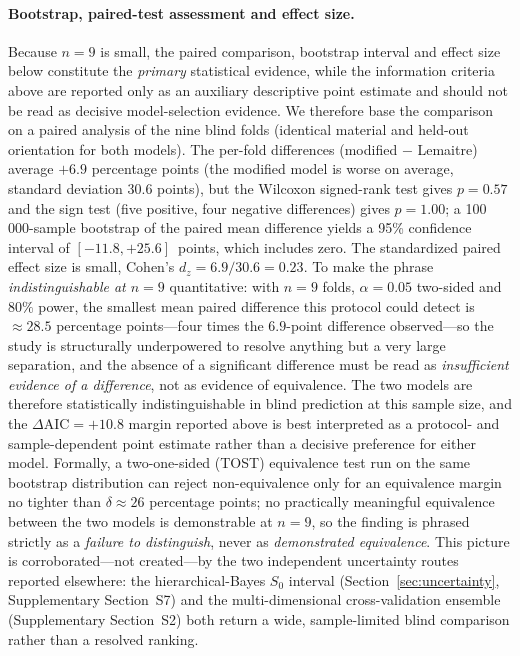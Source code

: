 \documentclass[12pt,a4paper,twocolumn]{article}
\begin{document}
\paragraph{Bootstrap, paired-test assessment and effect size.} Because $n = 9$ is small, the paired comparison, bootstrap interval and effect size below constitute the \emph{primary} statistical evidence, while the information criteria above are reported only as an auxiliary descriptive point estimate and should not be read as decisive model-selection evidence. We therefore base the comparison on a paired analysis of the nine blind folds (identical material and held-out orientation for both models). The per-fold differences (modified $-$ Lemaitre) average $+6.9$ percentage points (the modified model is worse on average, standard deviation $30.6$ points), but the Wilcoxon signed-rank test gives $p = 0.57$ and the sign test (five positive, four negative differences) gives $p = 1.00$; a 100\,000-sample bootstrap of the paired mean difference yields a 95\% confidence interval of $[-11.8, +25.6]$~points, which includes zero. The standardized paired effect size is small, Cohen's $d_z = 6.9/30.6 = 0.23$. To make the phrase \emph{indistinguishable at $n=9$} quantitative: with $n=9$ folds, $\alpha=0.05$ two-sided and $80\%$ power, the smallest mean paired difference this protocol could detect is $\approx 28.5$ percentage points---four times the $6.9$-point difference observed---so the study is structurally underpowered to resolve anything but a very large separation, and the absence of a significant difference must be read as \emph{insufficient evidence of a difference}, not as evidence of equivalence. The two models are therefore statistically indistinguishable in blind prediction at this sample size, and the $\Delta\mathrm{AIC} = +10.8$ margin reported above is best interpreted as a protocol- and sample-dependent point estimate rather than a decisive preference for either model. Formally, a two-one-sided (TOST) equivalence test run on the same bootstrap distribution can reject non-equivalence only for an equivalence margin no tighter than $\delta \approx 26$ percentage points; no practically meaningful equivalence between the two models is demonstrable at $n=9$, so the finding is phrased strictly as a \emph{failure to distinguish}, never as \emph{demonstrated equivalence}. This picture is corroborated---not created---by the two independent uncertainty routes reported elsewhere: the hierarchical-Bayes $S_0$ interval (Section~\ref{sec:uncertainty}, Supplementary Section~S7) and the multi-dimensional cross-validation ensemble (Supplementary Section~S2) both return a wide, sample-limited blind comparison rather than a resolved ranking.
\end{document}
